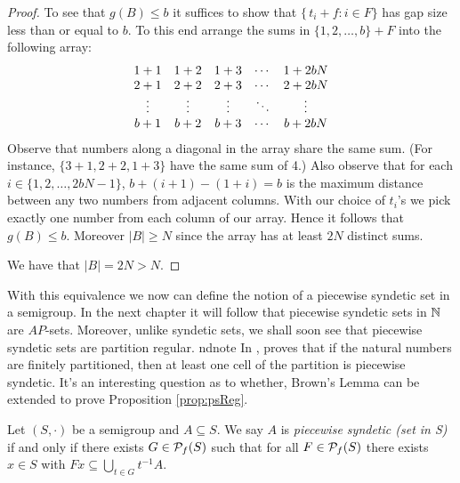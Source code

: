 \begin{proof}
  To see that $g(B) \le b$ it suffices to show that $\{\, t_i + f : i \in F\}$ has gap size less than or equal to $b$.
  To this end arrange the sums in $\{1, 2, \ldots, b\} + F$ into the following array:
  \[
    \begin{array}[t]{ccccc}
      1+1 & 1+2 & 1+3 & \cdots & 1+2bN \\
      2+1 & 2+2 & 2+3 & \cdots & 2+2bN \\
      \vdots & \vdots & \vdots & \ddots & \vdots \\
      b+1 & b+2 & b+3 & \cdots & b+2bN 
    \end{array}
  \]
  Observe that numbers along a diagonal in the array share the same sum. 
  (For instance, $\{3+1, 2+2, 1+3\}$ have the same sum of 4.)
  Also observe that for each $i \in \{1, 2, \ldots, 2bN - 1\}$, $b + (i+1) - (1 +i) = b$ is the maximum distance between any two numbers from adjacent columns. 
  With our choice of $t_i$'s we pick exactly one number from each column of our array.
  Hence it follows that $g(B) \le b$.
  Moreover $|B| \ge N$ since the array has at least $2N$ distinct sums. 

  We have that $|B| = 2N > N$.
\end{proof}

With this equivalence we now can define the notion of a piecewise
syndetic set in a semigroup. 
In the next chapter it will follow that piecewise syndetic sets in $\mathbb{N}$ are $AP$-sets.
Moreover, unlike syndetic sets, we shall soon see that piecewise syndetic sets are partition regular.%
ndnote{
  In \cite[Lemma 1]{Brown:1971bh}, proves that if the natural numbers are finitely partitioned, then at least one cell of the partition is piecewise syndetic.
  It's an interesting question as to whether, Brown's Lemma can be extended to prove Proposition \ref{prop:psReg}.
}

\begin{defn}
  Let $(S, \cdot)$ be a semigroup and $A \subseteq S$.
  We say $A$ is \emph{piecewise syndetic (set in S)} if and only if there exists $G \in \mathcal{P}_f(S)$ such that for all $F \in \mathcal{P}_f(S)$ there exists $x \in S$ with $Fx \subseteq \bigcup_{t \in G} t^{-1}A$.
\end{defn}

